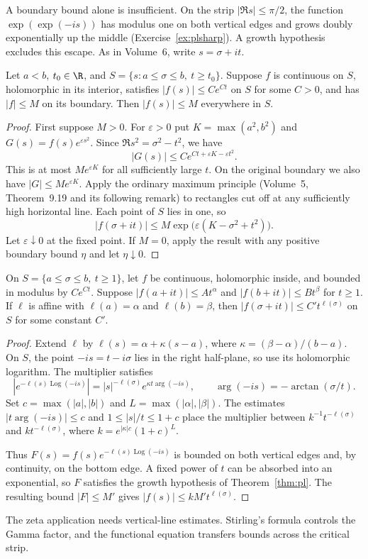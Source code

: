 A boundary bound alone is insufficient. On the strip $|\Re s|\le\pi/2$, the function $\exp(\exp(-is))$ has modulus one on both vertical edges and grows doubly exponentially up the middle (Exercise~\ref{ex:plsharp}). A growth hypothesis excludes this escape. As in Volume~6, write $s=\sigma+it$.

\begin{theorem}\label{thm:pl}
Let $a<b$, $t_0\in\R$, and $S=\{s:a\le\sigma\le b,\ t\ge t_0\}$. Suppose $f$ is continuous on $S$, holomorphic in its interior, satisfies $|f(s)|\le Ce^{Ct}$ on $S$ for some $C>0$, and has $|f|\le M$ on its boundary. Then $|f(s)|\le M$ everywhere in $S$.
\end{theorem}
\begin{proof}
First suppose $M>0$. For $\varepsilon>0$ put $K=\max(a^2,b^2)$ and $G(s)=f(s)e^{\varepsilon s^2}$. Since $\Re s^2=\sigma^2-t^2$, we have
\[|G(s)|\le Ce^{Ct+\varepsilon K-\varepsilon t^2}.
\]
This is at most $Me^{\varepsilon K}$ for all sufficiently large $t$. On the original boundary we also have $|G|\le Me^{\varepsilon K}$. Apply the ordinary maximum principle (Volume~5, Theorem~9.19 and its following remark) to rectangles cut off at any sufficiently high horizontal line. Each point of $S$ lies in one, so
\[|f(\sigma+it)|\le M\exp\bigl(\varepsilon(K-\sigma^2+t^2)\bigr).
\]
Let $\varepsilon\downarrow0$ at the fixed point. If $M=0$, apply the result with any positive boundary bound $\eta$ and let $\eta\downarrow0$.
\end{proof}

\begin{corollary}[convexity]\label{cor:convexity}
On $S=\{a\le\sigma\le b,\ t\ge1\}$, let $f$ be continuous, holomorphic inside, and bounded in modulus by $Ce^{Ct}$. Suppose $|f(a+it)|\le At^\alpha$ and $|f(b+it)|\le Bt^\beta$ for $t\ge1$. If $\ell$ is affine with $\ell(a)=\alpha$ and $\ell(b)=\beta$, then $|f(\sigma+it)|\le C't^{\ell(\sigma)}$ on $S$ for some constant $C'$.
\end{corollary}
\begin{proof}
Extend $\ell$ by $\ell(s)=\alpha+\kappa(s-a)$, where $\kappa=(\beta-\alpha)/(b-a)$. On $S$, the point $-is=t-i\sigma$ lies in the right half-plane, so use its holomorphic logarithm. The multiplier satisfies
\[\left|e^{-\ell(s)\operatorname{Log}(-is)}\right|
 =|s|^{-\ell(\sigma)}e^{\kappa t\arg(-is)},\qquad\arg(-is)=-\arctan(\sigma/t).
\]
Set $c=\max(|a|,|b|)$ and $L=\max(|\alpha|,|\beta|)$. The estimates $|t\arg(-is)|\le c$ and $1\le|s|/t\le1+c$ place the multiplier between $k^{-1}t^{-\ell(\sigma)}$ and $kt^{-\ell(\sigma)}$, where $k=e^{|\kappa|c}(1+c)^L$.

Thus $F(s)=f(s)e^{-\ell(s)\operatorname{Log}(-is)}$ is bounded on both vertical edges and, by continuity, on the bottom edge. A fixed power of $t$ can be absorbed into an exponential, so $F$ satisfies the growth hypothesis of Theorem~\ref{thm:pl}. The resulting bound $|F|\le M'$ gives $|f(s)|\le kM't^{\ell(\sigma)}$.
\end{proof}
The zeta application needs vertical-line estimates. Stirling's formula controls the Gamma factor, and the functional equation transfers bounds across the critical strip.


